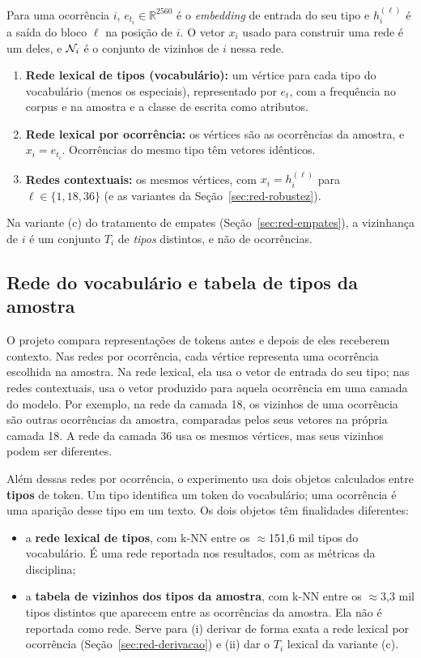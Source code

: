 Para uma ocorrência $i$, $e_{t_i}\in\mathbb{R}^{2560}$ é o \emph{embedding} de entrada do seu
tipo e $h_i^{(\ell)}$ é a saída do bloco $\ell$ na posição de $i$. O vetor $x_i$ usado para
construir uma rede é um deles, e $\mathcal{N}_i$ é o conjunto de vizinhos de $i$ nessa rede.
\begin{enumerate}
    \item \textbf{Rede lexical de tipos (vocabulário):} um vértice para cada tipo do
    vocabulário (menos os especiais), representado por $e_t$, com a frequência no corpus e na
    amostra e a classe de escrita como atributos.
    \item \textbf{Rede lexical por ocorrência:} os vértices são as ocorrências da amostra, e
    $x_i=e_{t_i}$. Ocorrências do mesmo tipo têm vetores idênticos.
    \item \textbf{Redes contextuais:} os mesmos vértices, com $x_i=h_i^{(\ell)}$ para
    $\ell\in\{1,18,36\}$ (e as variantes da Seção~\ref{sec:red-robustez}).
\end{enumerate}
Na variante (c) do tratamento de empates (Seção~\ref{sec:red-empates}), a vizinhança de $i$ é
um conjunto $T_i$ de \emph{tipos} distintos, e não de ocorrências.

\subsection{Rede do vocabulário e tabela de tipos da amostra}\label{sec:vocab-vs-amostra}

O projeto compara representações de tokens antes e depois de eles receberem contexto. Nas
redes por ocorrência, cada vértice representa uma ocorrência escolhida na amostra. Na rede
lexical, ela usa o vetor de entrada do seu tipo; nas redes contextuais, usa o vetor produzido
para aquela ocorrência em uma camada do modelo. Por exemplo, na rede da camada 18, os vizinhos
de uma ocorrência são outras ocorrências da amostra, comparadas pelos seus vetores na própria
camada 18. A rede da camada 36 usa os mesmos vértices, mas seus vizinhos podem ser diferentes.

Além dessas redes por ocorrência, o experimento usa dois objetos calculados entre \textbf{tipos}
de token. Um tipo identifica um token do vocabulário; uma ocorrência é uma aparição desse tipo
em um texto. Os dois objetos têm finalidades diferentes:
\begin{itemize}
    \item a \textbf{rede lexical de tipos}, com k-NN entre os $\approx$151,6 mil tipos do
    vocabulário. É uma rede reportada nos resultados, com as métricas da disciplina;
    \item a \textbf{tabela de vizinhos dos tipos da amostra}, com k-NN entre os $\approx$3,3 mil
    tipos distintos que aparecem entre as ocorrências da amostra. Ela não é reportada como
    rede. Serve para (i) derivar de forma exata a rede lexical por ocorrência
    (Seção~\ref{sec:red-derivacao}) e (ii) dar o $T_i$ lexical da variante (c).
\end{itemize}

